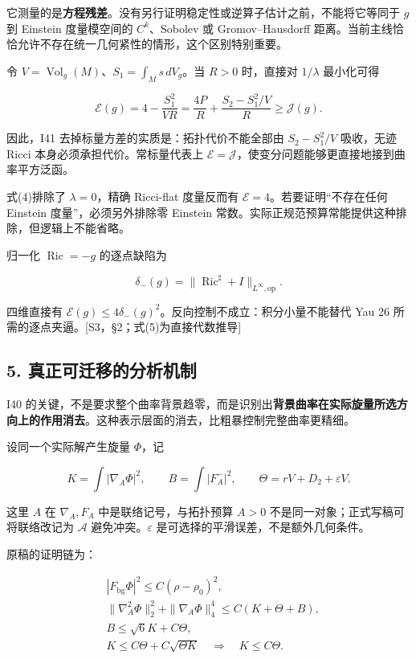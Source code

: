 \documentclass[UTF8,a4paper,11pt,fontset=fandol]{ctexart}
\begin{document}
它测量的是\textbf{方程残差}。没有另行证明稳定性或逆算子估计之前，不能将它等同于
\(g\) 到 Einstein 度量模空间的 \(C^k\)、Sobolev 或 Gromov--Hausdorff
距离。当前主线恰恰允许不存在统一几何紧性的情形，这个区别特别重要。

令 \(V=\operatorname{Vol}_g(M)\)、\(S_1=\int_Ms\,dV_g\)。当 \(R>0\)
时，直接对 \(1/\lambda\) 最小化可得

\[
\boxed{
\mathcal E(g)=4-\frac{S_1^2}{VR}
=\frac{4P}{R}+\frac{S_2-S_1^2/V}{R}
\ge\mathcal J(g).
}
\tag{5}
\]

因此，I41 去掉标量方差的实质是：拓扑代价不能全部由 \(S_2-S_1^2/V\)
吸收，无迹 Ricci 本身必须承担代价。常标量代表上
\(\mathcal E=\mathcal J\)，使变分问题能够更直接地接到曲率平方泛函。

式(4)排除了 \(\lambda=0\)，精确 Ricci-flat 度量反而有
\(\mathcal E=4\)。若要证明``不存在任何 Einstein 度量''，必须另外排除零
Einstein 常数。实际正规范预算常能提供这种排除，但逻辑上不能省略。

归一化 \(\operatorname{Ric}=-g\) 的逐点缺陷为

\[
\delta_-(g)=\|\operatorname{Ric}^{\sharp}+I\|_{L^\infty,\mathrm{op}}.
\]

四维直接有
\(\mathcal E(g)\le4\delta_-(g)^2\)。反向控制不成立：积分小量不能替代 Yau
26 所需的逐点夹逼。{[}S3，§2；式(5)为直接代数推导{]}

\subsection{5.
真正可迁移的分析机制}\label{ux771fux6b63ux53efux8fc1ux79fbux7684ux5206ux6790ux673aux5236}

I40
的关键，不是要求整个曲率背景趋零，而是识别出\textbf{背景曲率在实际旋量所选方向上的作用消去}。这种表示层面的消去，比粗暴控制完整曲率更精细。

设同一个实际解产生旋量 \(\Phi\)，记

\[
K=\int|\nabla_A\Phi|^2,\qquad
B=\int|F_A^-|^2,\qquad
\Theta=rV+D_2+\varepsilon V.
\]

这里 \(A\) 在 \(\nabla_A,F_A\) 中是联络记号，与拓扑预算 \(A>0\)
不是同一对象；正式写稿可将联络改记为 \(\mathcal A\)
避免冲突。\(\varepsilon\) 是可选择的平滑误差，不是额外几何条件。

原稿的证明链为：

\[
\begin{aligned}
&|F_{\mathrm{bg}}\Phi|^2
\le C(\rho-\rho_0)^2,\\
&\|\nabla_A^2\Phi\|_2^2+
\|\nabla_A\Phi\|_4^4\le C(K+\Theta+B),\\
&B\le\sqrt6K+C\Theta,\\
&K\le C\Theta+C\sqrt{\Theta K}
\quad\Longrightarrow\quad K\le C\Theta.
\end{aligned}
\tag{6}
\]
\end{document}
